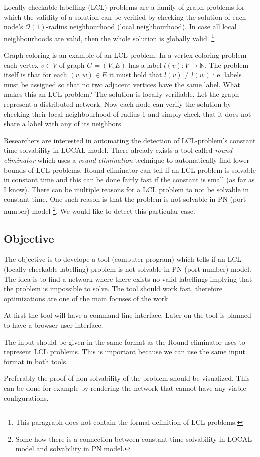 Locally checkable labelling (LCL) problems are a family of graph problems for which the validity of a solution can be verified by checking the solution of each node's $\mathcal{O}(1)$-radius neighbourhood (local neighbourhood).
In case all local neighbourhoods are valid, then the whole solution is globally valid.
\cite{DBLP:conf/podc/BrandtHKLOPRSU17}
\footnote{This paragraph does not contain the formal definition of LCL problems.}

Graph coloring is an example of an LCL problem.
In a vertex coloring problem each vertex $v \in V$ of graph $G = (V, E)$ has a label $l(v): V \rightarrow \mathbb{N}$.
The problem itself is that for each $(v, w) \in E$ it must hold that $l(v) \neq l(w)$ i.e. labels must be assigned so that no two adjacent vertices have the same label.
What makes this an LCL problem?
The solution is locally verifiable.
Let the graph represent a distributed network.
Now each node can verify the solution by checking their local neighbourhood of radius 1 and simply check that it does not share a label with any of its neighbors.

Researchers are interested in automating the detection of LCL-problem's constant time solvability in LOCAL model.
There already exists a tool called \emph{round eliminator} \cite{DBLP:conf/podc/Olivetti20} which uses a \emph{round elimination} \cite{DBLP:conf/podc/Brandt19} technique to automatically find lower bounds of LCL problems.
Round eliminator can tell if an LCL problem is solvable in constant time and this can be done fairly fast if the constant is small (as far as I know).
There can be multiple reasons for a LCL problem to not be solvable in constant time.
One such reason is that the problem is not solvable in PN (port number) model
\footnote{Some how there is a connection between constant time solvability in LOCAL model and solvability in PN model.}.
We would like to detect this particular case.


\subsection*{Objective} %
The objective is to develope a tool (computer program) which tells if an LCL (locally checkable labelling) problem is not solvable in PN (port number) model.
The idea is to find a network where there exists no valid labellings implying that the problem is impossible to solve.
The tool should work fast, therefore optimizations are one of the main focuses of the work.

At first the tool will have a command line interface.
Later on the tool is planned to have a browser user interface.

The input should be given in the same format as the Round eliminator uses to represent LCL problems.
This is important because we can use the same input format in both tools.

Preferably the proof of non-solvability of the problem should be visualized.
This can be done for example by rendering the network that cannot have any viable configurations.
